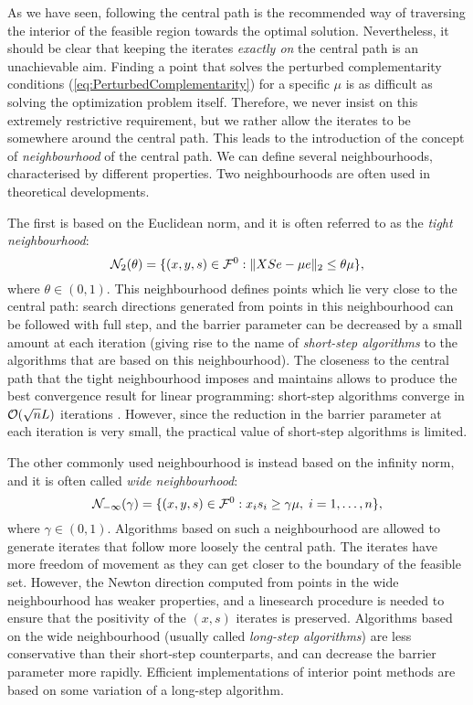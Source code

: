 As we have seen, following the central path is the recommended
way of traversing the interior of the feasible region towards
the optimal solution. Nevertheless, it should be clear that keeping the
iterates {\em exactly on} the central path is an unachievable aim.
Finding a point that solves the perturbed complementarity conditions 
(\ref{eq:PerturbedComplementarity}) for a specific $\mu$ 
is as difficult as solving the optimization problem itself.
%
Therefore, we never insist on this extremely restrictive requirement,
but we rather allow the iterates to be somewhere around the central path.
This leads to the introduction of the concept of
{\em neighbourhood} of the central path. 
We can define several neighbourhoods, characterised
by different properties.
Two neighbourhoods are often used in theoretical developments.

The first is based on the Euclidean norm, and it is often referred
to as the {\em tight neighbourhood}:
\[
\mathcal{N}_2(\theta) = \{ (x,y,s) \in \mathcal{F}^0 :
                         \| XSe - \mu e \|_2 \le \theta\mu \},
\]
where $\theta \in (0,1)$.
This neighbourhood defines points which lie very close to the central path:
search directions generated from points in this neighbourhood can be 
followed with full step, and the barrier parameter can be decreased
by a small amount at each iteration (giving rise to the name
of {\em short-step algorithms} to the algorithms that are based on
this neighbourhood). 
The closeness to the central path that the tight neighbourhood
imposes and maintains allows to produce the best convergence result
for linear programming: short-step algorithms converge in 
$\mathcal{O}(\sqrt{n}L)$ iterations \cite{KojimaMizunoYoshise89b,MonteiroAdler89a}.
However, since the reduction in the barrier parameter at each iteration 
is very small, the practical value of short-step algorithms is limited.

The other commonly used neighbourhood is instead based on the infinity norm, 
and it is often called {\em wide neighbourhood}:
\[
\mathcal{N}_{-\infty}(\gamma) = \{ (x,y,s) \in \mathcal{F}^0 :
                         x_is_i \ge \gamma\mu, \; i = 1, \ldots, n \},
\]
where $\gamma \in (0,1).$
Algorithms based on such a neighbourhood are allowed to generate
iterates that follow more loosely the central path. The iterates 
have more freedom of movement as they can get closer to the boundary
of the feasible set.
However, the Newton direction computed from points in the wide 
neighbourhood  has weaker properties, and a linesearch procedure is
needed to ensure that the positivity of the $(x,s)$ iterates is
preserved.
Algorithms based on the wide neighbourhood (usually called
{\em long-step algorithms}) are less conservative than their short-step
counterparts, and can decrease 
the barrier parameter more rapidly.
Efficient implementations of interior point methods are based
on some variation of a long-step algorithm.


